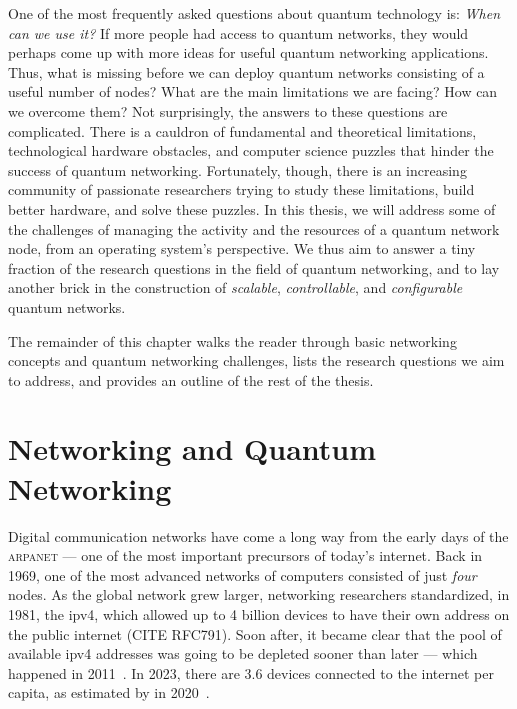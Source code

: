 One of the most frequently asked questions about quantum technology is: \emph{When can we use it?}
If more people had access to quantum networks, they would perhaps come up with more ideas for useful
quantum networking applications. Thus, what is missing before we can deploy quantum networks
consisting of a useful number of nodes? What are the main limitations we are facing? How can we
overcome them? Not surprisingly, the answers to these questions are complicated. There is a cauldron
of fundamental and theoretical limitations, technological hardware obstacles, and computer science
puzzles that hinder the success of quantum networking. Fortunately, though, there is an increasing
community of passionate researchers trying to study these limitations, build better hardware, and
solve these puzzles. In this thesis, we will address some of the challenges of managing the activity
and the resources of a quantum network node, from an operating system's perspective. We thus aim to
answer a tiny fraction of the research questions in the field of quantum networking, and to lay
another brick in the construction of \emph{scalable}, \emph{controllable}, and \emph{configurable}
quantum networks.

The remainder of this chapter walks the reader through basic networking concepts and quantum
networking challenges, lists the research questions we aim to address, and provides an outline of
the rest of the thesis.

\section{Networking and Quantum Networking}

Digital communication networks have come a long way from the early days of the \textsc{arpanet} ---
one of the most important precursors of today's internet. Back in 1969, one of the most advanced
networks of computers consisted of just \emph{four} nodes. As the global network grew larger,
networking researchers standardized, in 1981, the \acrfull{ipv4}, which allowed up to \num{4}
billion devices to have their own address on the public internet (CITE RFC791). Soon after, it
became clear that the pool of available \acrshort{ipv4} addresses was going to be depleted sooner
than later --- which happened in 2011~\cite{icann_2011}. In 2023, there are \num{3.6} devices
connected to the internet per capita, as estimated by \citeauthor{cisco_2020} in
2020~\cite{cisco_2020}.

